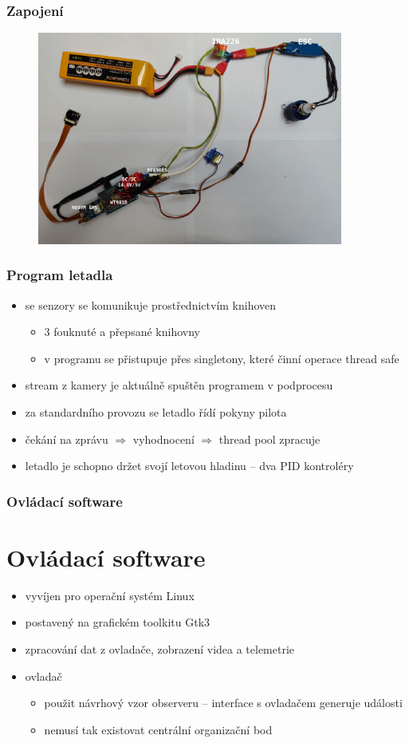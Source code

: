 \documentclass[aspectratio=43]{beamer}
\begin{document}
\begin{frame}[fragile]
	\frametitle{Zapojení}
	\begin{figure}[h]
		\centering
		\includegraphics[height=7cm]{./../img/circuit.jpg}
	\end{figure}
\end{frame}

\begin{frame}[fragile]
	\frametitle{Program letadla}
	\begin{itemize}
		\item se senzory se komunikuje prostřednictvím knihoven
			\begin{itemize}
				\item 3 fouknuté a přepsané knihovny
				\item v programu se přistupuje přes singletony, které činní operace thread safe
			\end{itemize}
		\item stream z kamery je aktuálně spuštěn programem v podprocesu
		\item za standardního provozu se letadlo řídí pokyny pilota
		\item čekání na zprávu $\Rightarrow$ vyhodnocení $\Rightarrow$ thread pool zpracuje
		\item letadlo je schopno držet svojí letovou hladinu -- dva PID kontroléry
	\end{itemize}
\end{frame}

\begin{frame}[fragile]
	\frametitle{Ovládací software}
	\section{Ovládací software}
	\begin{itemize}
		\item vyvíjen pro operační systém Linux
		\item postavený na grafickém toolkitu Gtk3
		\item zpracování dat z ovladače, zobrazení videa a telemetrie
		\item ovladač
			\begin{itemize}
				\item použit návrhový vzor observeru -- interface s ovladačem generuje události
				\item nemusí tak existovat centrální organizační bod
			\end{itemize}
	\end{itemize}
\end{frame}
\end{document}
